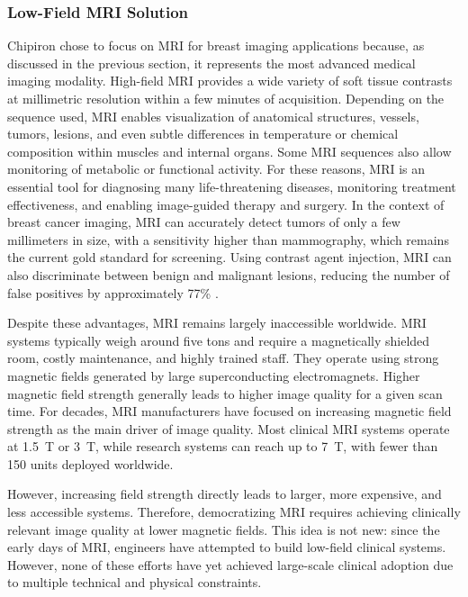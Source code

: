\documentclass[12pt]{article}
\begin{document}
\subsubsection{Low-Field MRI Solution}
Chipiron chose to focus on MRI for breast imaging applications because, as discussed in the previous section, it represents the most advanced medical imaging modality.
High-field MRI provides a wide variety of soft tissue contrasts at millimetric resolution within a few minutes of acquisition.
Depending on the sequence used, MRI enables visualization of anatomical structures, vessels, tumors, lesions, and even subtle differences in temperature or chemical composition within muscles and internal organs. 
Some MRI sequences also allow monitoring of metabolic or functional activity. 
For these reasons, MRI is an essential tool for diagnosing many life-threatening diseases, monitoring treatment effectiveness, and enabling image-guided therapy and surgery.
In the context of breast cancer imaging, MRI can accurately detect tumors of only a few millimeters in size, with a sensitivity higher than mammography, which remains the current gold standard for screening. 
Using contrast agent injection, MRI can also discriminate between benign and malignant lesions, reducing the number of false positives by approximately 77\% \cite{diag2026}.
\vspace{0.5cm}

Despite these advantages, MRI remains largely inaccessible worldwide. 
MRI systems typically weigh around five tons and require a magnetically shielded room, costly maintenance, and highly trained staff. 
They operate using strong magnetic fields generated by large superconducting electromagnets. 
Higher magnetic field strength generally leads to higher image quality for a given scan time.
For decades, MRI manufacturers have focused on increasing magnetic field strength as the main driver of image quality. 
Most clinical MRI systems operate at 1.5~T or 3~T, while research systems can reach up to 7~T, with fewer than 150 units deployed worldwide.
\vspace{0.5cm}

However, increasing field strength directly leads to larger, more expensive, and less accessible systems. 
Therefore, democratizing MRI requires achieving clinically relevant image quality at lower magnetic fields. 
This idea is not new: since the early days of MRI, engineers have attempted to build low-field clinical systems. 
However, none of these efforts have yet achieved large-scale clinical adoption due to multiple technical and physical constraints.
\vspace{0.5cm}
\end{document}
